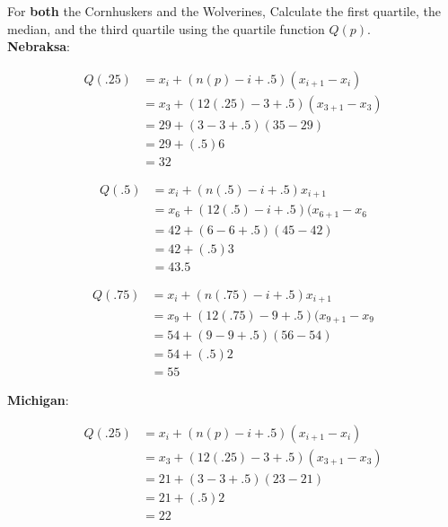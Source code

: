 \documentclass[11pt]{article}\usepackage[]{graphicx}\usepackage[]{color}
\begin{document}
\item For \textbf{both} the Cornhuskers and the Wolverines, 
 Calculate the first quartile, the median, and the third quartile using the quartile function $Q(p)$.   \\

   \textbf{Nebraksa}:

   \begin{align*}
      Q(.25) &= x_i + (n (p) - i + .5) (x_{i + 1} - x_i)  \tag{since $n p + 0.5 = 3.50 $} \\
             &= x_3 + (12 (.25) - 3 + .5) (x_{3 + 1} - x_3)  \tag{since $p = 0.25$} \\
             &= 29 + (3 - 3 + .5) (35 - 29)  \\
             &= 29 + (.5) 6  \\
             &= 32
   \end{align*}

   \begin{align*}
      Q(.5) &= x_i + (n (.5) - i + .5) x_{i + 1}  \tag{since $n p + 0.5 = 6.50 $} \\
             &= x_6 + (12 (.5) - i + .5) (x_{6 + 1} - x_6  \tag{since $p = 0.5$} \\
             &= 42 + (6 - 6 + .5) (45  - 42) \\
             &= 42 + (.5)3 \\
             &= 43.5
   \end{align*}

   \begin{align*}
      Q(.75) &= x_i + (n (.75) - i + .5) x_{i + 1}  \tag{since $n p + 0.5 = 9.50 $} \\
             &= x_9 + (12 (.75) - 9 + .5) (x_{9 + 1} - x_9  \tag{since $p = 0.75$} \\
             &= 54 + (9 - 9 + .5) (56  - 54) \\
             &= 54 + (.5)2 \\
             &= 55
   \end{align*}

   \textbf{Michigan}:

   \begin{align*}
      Q(.25) &= x_i + (n (p) - i + .5) (x_{i + 1} - x_i)  \tag{since $n p + 0.5 = 3.50 $} \\
             &= x_3 + (12 (.25) - 3 + .5) (x_{3 + 1} - x_3)  \tag{since $p = 0.25$} \\
             &= 21 + (3 - 3 + .5) (23 - 21)  \\
             &= 21 + (.5) 2  \\
             &= 22
   \end{align*}
\end{document}
